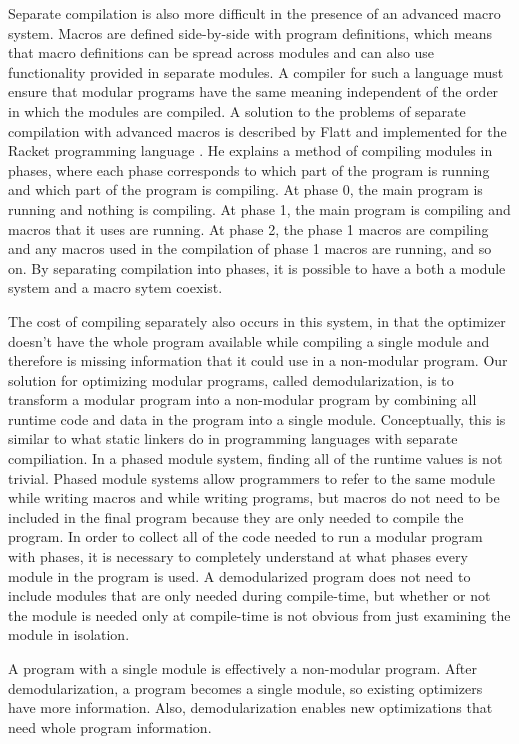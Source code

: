Separate compilation is also more difficult in the presence of an advanced macro system.
Macros are defined side-by-side with program definitions, which means that macro definitions can be spread across modules and can also use functionality provided in separate modules.
A compiler for such a language must ensure that modular programs have the same meaning independent of the order in which the modules are compiled.
A solution to the problems of separate compilation with advanced macros is described by Flatt and implemented for the Racket programming language \cite{Flatt}.
He explains a method of compiling modules in phases, where each phase corresponds to which part of the program is running and which part of the program is compiling.
At phase 0, the main program is running and nothing is compiling.
At phase 1, the main program is compiling and macros that it uses are running.
At phase 2, the phase 1 macros are compiling and any macros used in the compilation of phase 1 macros are running, and so on.
By separating compilation into phases, it is possible to have a both a module system and a macro sytem coexist.

The cost of compiling separately also occurs in this system, in that the optimizer doesn't have the whole program available while compiling a single module and therefore is missing information that it could use in a non-modular program.  Our solution for optimizing modular programs, called demodularization, is to transform a modular program into a non-modular program by combining all runtime code and data in the program into a single module.
Conceptually, this is similar to what static linkers do in programming languages with separate compiliation.
In a phased module system, finding all of the runtime values is not trivial.
Phased module systems allow programmers to refer to the same module while writing macros and while writing programs, but macros do not need to be included in the final program because they are only needed to compile the program.
In order to collect all of the code needed to run a modular program with phases, it is necessary to completely understand at what phases every module in the program is used. 
A demodularized program does not need to include modules that are only needed during compile-time, but whether or not the module is needed only at compile-time is not obvious from just examining the module in isolation. 

A program with a single module is effectively a non-modular program. 
After demodularization, a program becomes a single module, so existing optimizers have more information. 
Also, demodularization enables new optimizations that need whole program information. 

